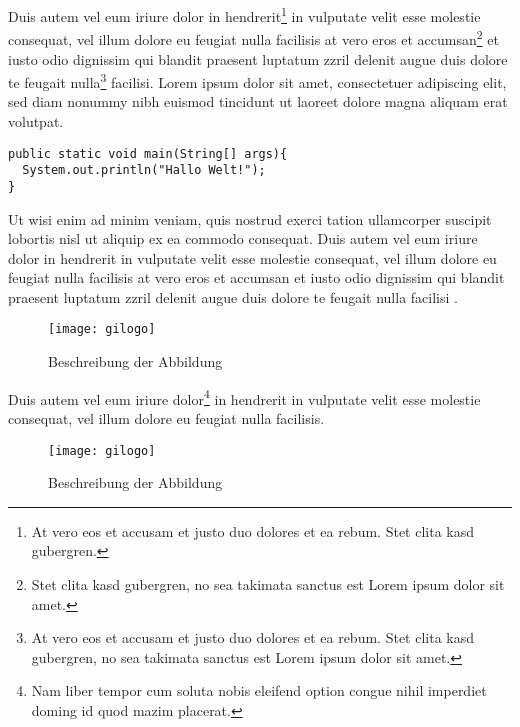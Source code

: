 \documentclass{akdw}
\begin{document}
Duis autem vel eum iriure dolor \cite[S. 1254]{Gl06} in hendrerit\footnote{At vero eos et accusam et justo duo dolores et 
ea rebum. Stet clita kasd gubergren.} in vulputate velit esse molestie consequat, vel illum dolore 
eu feugiat nulla facilisis at vero eros et accumsan\footnote{Stet clita kasd gubergren, no sea 
takimata sanctus est Lorem ipsum dolor sit amet.} et iusto odio \cite[S. 123]{Gl01} dignissim qui blandit praesent 
luptatum zzril delenit augue duis dolore te \cite{HTML16} feugait nulla\footnote{At vero eos et accusam et justo 
duo dolores et ea rebum. Stet clita kasd gubergren, no sea takimata sanctus est Lorem ipsum dolor 
sit amet.} facilisi. Lorem ipsum dolor sit amet, consectetuer adipiscing elit, sed diam nonummy nibh 
euismod tincidunt ut laoreet dolore magna aliquam erat volutpat. 


\begin{lstlisting}
public static void main(String[] args){
  System.out.println("Hallo Welt!");
}   
\end{lstlisting}



Ut wisi enim ad minim veniam, quis nostrud exerci tation 
ullamcorper suscipit lobortis nisl ut aliquip ex ea commodo consequat. Duis autem vel eum iriure 
dolor in hendrerit in vulputate velit esse molestie consequat, vel illum dolore eu feugiat nulla 
facilisis at vero eros et accumsan et iusto odio dignissim qui blandit praesent luptatum zzril 
delenit augue duis dolore te feugait nulla facilisi \cite[S. 14]{Ez10}. 

\begin{figure}[htb]
  \begin{center}
    \texttt{[image: gilogo]}
    \caption{\label{logo}Beschreibung der Abbildung}
  \end{center}
\end{figure}

Duis autem vel eum iriure dolor\footnote{Nam liber tempor cum soluta nobis eleifend option congue 
nihil imperdiet doming id quod mazim placerat.}  in hendrerit in vulputate velit esse molestie 
consequat, vel illum dolore eu feugiat nulla facilisis. 

\begin{figure}[htb]
  \begin{center}
    \texttt{[image: gilogo]}
    \caption{\label{logo1}Beschreibung der Abbildung}
  \end{center}
\end{figure}
\end{document}
